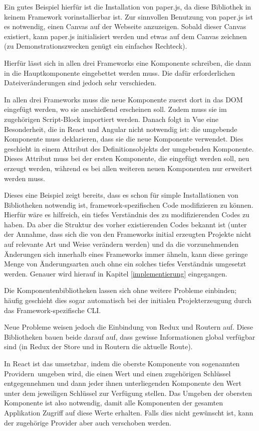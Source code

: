 Ein gutes Beispiel hierfür ist die Installation von paper.js, da diese Bibliothek in keinem Framework vorinstallierbar ist. Zur sinnvollen Benutzung von paper.js ist es notwendig, einen Canvas auf der Webseite anzuzeigen. Sobald dieser Canvas existiert, kann paper.js initialisiert werden und etwas auf dem Canvas zeichnen (zu Demonstrationszwecken genügt ein einfaches Rechteck).

Hierfür lässt sich in allen drei Frameworks eine Komponente schreiben, die dann in die Hauptkomponente eingebettet werden muss. Die dafür erforderlichen Dateiveränderungen sind jedoch sehr verschieden.

In allen drei Frameworks muss die neue Komponente zuerst dort in das \gls{DOM} eingefügt werden, wo sie anschießend erscheinen soll. Zudem muss sie im zugehörigen Script-Block importiert werden. Danach folgt in Vue eine Besonderheit, die in React und Angular nicht notwendig ist: die umgebende Komponente muss deklarieren, dass sie die neue Komponente verwendet. Dies geschieht in einem Attribut des Definitionsobjekts der umgebenden Komponente. Dieses Attribut muss bei der ersten Komponente, die eingefügt werden soll, neu erzeugt werden, während es bei allen weiteren neuen Komponenten nur erweitert werden muss.

Dieses eine Beispiel zeigt bereits, dass es schon für simple Installationen von Bibliotheken notwendig ist, framework-spezifischen Code modifizieren zu können. Hierfür wäre es hilfreich, ein tiefes Verständnis des zu modifizierenden Codes zu haben. Da aber die Struktur des vorher existierenden Codes bekannt ist (unter der Annahme, dass sich die von den Frameworks initial erzeugten Projekte nicht auf relevante Art und Weise verändern werden) und da die vorzunehmenden Änderungen sich innerhalb eines Frameworks immer ähneln, kann diese geringe Menge von Änderungsarten auch ohne ein solches tiefes Verständnis umgesetzt werden. Genauer wird hierauf in Kapitel \ref{implementierung} eingegangen.

Die Komponentenbibliotheken lassen sich ohne weitere Probleme einbinden; häufig geschieht dies sogar automatisch bei der initialen Projekterzeugung durch das Framework-spezifische \gls{CLI}.

Neue Probleme weisen jedoch die Einbindung von Redux und Routern auf. Diese Bibliotheken bauen beide darauf auf, dass gewisse Informationen global verfügbar sind (in Redux der Store und in Routern die aktuelle Route).

In React ist das umsetzbar, indem die oberste Komponente von sogenannten \glqq Providern\grqq\ umgeben wird, die einen Wert und einen zugehörigen Schlüssel entgegennehmen und dann jeder ihnen unterliegenden Komponente den Wert unter dem jeweiligen Schlüssel zur Verfügung stellen. Das Umgeben der obersten Komponente ist also notwendig, damit alle Komponenten der gesamten Applikation Zugriff auf diese Werte erhalten. Falls dies nicht gewünscht ist, kann der zugehörige Provider aber auch verschoben werden.

